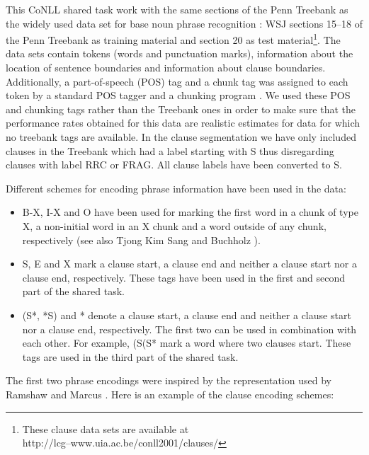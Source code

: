 This CoNLL shared task work with the same
sections of the Penn Treebank as the widely used data set for 
base noun phrase recognition \cite{ramshaw95}:
WSJ sections 15--18 of the Penn Treebank as training material and 
section 20 as test material\footnote{ 
 These clause data sets are available at\\
 http://lcg--www.uia.ac.be/conll2001/clauses/
}.
The data sets contain tokens (words and punctuation marks), information 
about the location of sentence boundaries and information about clause
boundaries. 
Additionally, a part-of-speech (POS) tag and a chunk tag was assigned
to each token by a standard POS tagger \cite{brill94} and a chunking
program \cite{tks2000}. 
We used these POS and chunking tags rather than the Treebank ones in
order to make  sure that the performance rates obtained for this data
are realistic estimates for data for which no treebank tags are
available. 
In the clause segmentation we have only included clauses in the
Treebank which had a label starting with S thus disregarding
clauses with label RRC or FRAG.
All clause labels have been converted to S.

Different schemes for encoding phrase information have been used in
the data:

\begin{itemize}
\item B-X, I-X and O have been used for marking the first word in a
   chunk of type X, a non-initial word in an X chunk and a word
   outside of any chunk, respectively
   (see also Tjong Kim Sang and Buchholz ).
\item S, E and X mark a clause start, a clause end and neither a 
   clause start nor a clause end, respectively.
   These tags have been used in the first and second part of the
   shared task.
\item (S*, *S) and * denote a clause start, a clause end and neither a 
   clause start nor a clause end, respectively.
   The first two can be used in combination with each other.
   For example, (S(S* mark a word where two clauses start.
   These tags are used in the third part of the shared task.
\end{itemize}

\noindent
The first two phrase encodings were inspired by the representation
used by Ramshaw and Marcus .
Here is an example of the clause encoding schemes:

